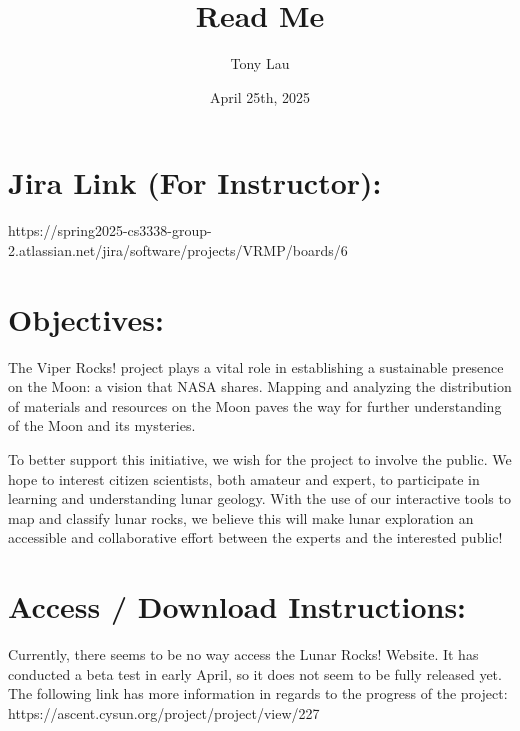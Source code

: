 \documentclass{article}
\begin{document}
\title{Read Me}
\author{Tony Lau}
\date{April 25th, 2025}

\fancyhf{}
\fancyfoot[C]{\thepage}

\section{Jira Link (For Instructor): }
https://spring2025-cs3338-group-2.atlassian.net/jira/software/projects/VRMP/boards/6

\section{Objectives: }
The Viper Rocks! project plays a vital role in establishing a sustainable presence on the Moon: a vision that NASA shares. Mapping and analyzing the distribution of materials and resources on the Moon paves the way for further understanding of the Moon and its mysteries.

To better support this initiative, we wish for the project to involve the public. We hope to interest citizen scientists, both amateur and expert, to participate in learning and understanding lunar geology. With the use of our interactive tools to map and classify lunar rocks, we believe this will make lunar exploration an accessible and collaborative effort between the experts and the interested public!

\section{Access / Download Instructions: }
Currently, there seems to be no way access the Lunar Rocks! Website. It has conducted a beta test in early April, so it does not seem to be fully released yet. The following link has more information in regards to the progress of the project:
https://ascent.cysun.org/project/project/view/227
\end{document}
